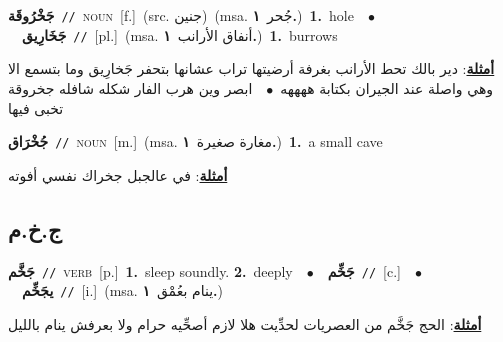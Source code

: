\documentclass[10pt,a4paper,twoside]{article} %
\begin{document}
\begin{multicols}{2}
{\setlength\topsep{0pt}\textbf{\foreignlanguage{arabic}{جَخْرُوقَة}}\ {\color{gray}\texttt{//}\color{black}}\ \textsc{noun}\ [f.]\ (src. \color{gray}\foreignlanguage{arabic}{جنين}\color{black})\ \color{gray}(msa. \foreignlanguage{arabic}{جُحر}~\foreignlanguage{arabic}{\textbf{١.}})\color{black}\ \textbf{1.}~hole\ \ $\bullet$\ \ \setlength\topsep{0pt}\textbf{\foreignlanguage{arabic}{جَخَارِيق}}\ {\color{gray}\texttt{//}\color{black}}\ [pl.]\ \color{gray}(msa. \foreignlanguage{arabic}{أنفاق الأرانب}~\foreignlanguage{arabic}{\textbf{١.}})\color{black}\ \textbf{1.}~burrows\  \begin{flushright}\color{gray}\foreignlanguage{arabic}{\textbf{\underline{\foreignlanguage{arabic}{أمثلة}}}: دير بالك تحط الأرانب بغرفة أرضيتها تراب عشانها بتحفر جَخارِيق وما بتسمع الا وهي واصلة عند الجيران بكتابة ههههه\ $\bullet$\ \  ابصر وين هرب الفار شكله شافله جخروقة تخبى فيها}\end{flushright}\color{black}} \vspace{2mm}

{\setlength\topsep{0pt}\textbf{\foreignlanguage{arabic}{جُخْرَاق}}\ {\color{gray}\texttt{//}\color{black}}\ \textsc{noun}\ [m.]\ \color{gray}(msa. \foreignlanguage{arabic}{مغارة صغيرة}~\foreignlanguage{arabic}{\textbf{١.}})\color{black}\ \textbf{1.}~a small cave\  \begin{flushright}\color{gray}\foreignlanguage{arabic}{\textbf{\underline{\foreignlanguage{arabic}{أمثلة}}}: في عالجبل جخراك نفسي أفوته}\end{flushright}\color{black}} \vspace{2mm}

\vspace{-3mm}
\subsection*{\color{blue}\foreignlanguage{arabic}{ج.خ.م}\color{blue}{}} 

{\setlength\topsep{0pt}\textbf{\foreignlanguage{arabic}{جَخَّم}}\ {\color{gray}\texttt{//}\color{black}}\ \textsc{verb}\ [p.]\ \textbf{1.}~sleep soundly.  \textbf{2.}~deeply\ \ $\bullet$\ \ \setlength\topsep{0pt}\textbf{\foreignlanguage{arabic}{جَخِّم}}\ {\color{gray}\texttt{//}\color{black}}\ [c.]\ \ $\bullet$\ \ \setlength\topsep{0pt}\textbf{\foreignlanguage{arabic}{يجَخِّم}}\ {\color{gray}\texttt{//}\color{black}}\ [i.]\ \color{gray}(msa. \foreignlanguage{arabic}{ينام بعُمْق}~\foreignlanguage{arabic}{\textbf{١.}})\color{black}\  \begin{flushright}\color{gray}\foreignlanguage{arabic}{\textbf{\underline{\foreignlanguage{arabic}{أمثلة}}}: الحج جَخَّم من العصريات لحدِّيت هلا لازم أصحِّيه حرام ولا بعرفش ينام بالليل}\end{flushright}\color{black}} \vspace{2mm}


\end{multicols}
\end{document}
